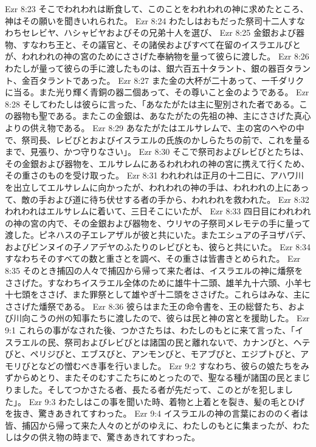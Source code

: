 Ezr 8:23  そこでわれわれは断食して、このことをわれわれの神に求めたところ、神はその願いを聞きいれられた。
Ezr 8:24  わたしはおもだった祭司十二人すなわちセレビヤ、ハシャビヤおよびその兄弟十人を選び、
Ezr 8:25  金銀および器物、すなわち王と、その議官と、その諸侯およびすべて在留のイスラエルびとが、われわれの神の宮のためにささげた奉納物を量って彼らに渡した。
Ezr 8:26  わたしが量って彼らの手に渡したものは、銀六百五十タラント、銀の器百タラント、金百タラントであった。
Ezr 8:27  また金の大杯が二十あって、一千ダリクに当る。また光り輝く青銅の器二個あって、その尊いこと金のようである。
Ezr 8:28  そしてわたしは彼らに言った、「あなたがたは主に聖別された者である。この器物も聖である。またこの金銀は、あなたがたの先祖の神、主にささげた真心よりの供え物である。
Ezr 8:29  あなたがたはエルサレムで、主の宮のへやの中で、祭司長、レビびとおよびイスラエルの氏族のかしらたちの前で、これを量るまで、見張り、かつ守りなさい」。
Ezr 8:30  そこで祭司およびレビびとたちは、その金銀および器物を、エルサレムにあるわれわれの神の宮に携えて行くため、その重さのものを受け取った。
Ezr 8:31  われわれは正月の十二日に、アハワ川を出立してエルサレムに向かったが、われわれの神の手は、われわれの上にあって、敵の手および道に待ち伏せする者の手から、われわれを救われた。
Ezr 8:32  われわれはエルサレムに着いて、三日そこにいたが、
Ezr 8:33  四日目にわれわれの神の宮の内で、その金銀および器物を、ウリヤの子祭司メレモテの手に量って渡した。ピネハスの子エレアザルが彼と共にいた。またエシュアの子ヨザバデ、およびビンヌイの子ノアデヤのふたりのレビびとも、彼らと共にいた。
Ezr 8:34  すなわちそのすべての数と重さとを調べ、その重さは皆書きとめられた。
Ezr 8:35  そのとき捕囚の人々で捕囚から帰って来た者は、イスラエルの神に燔祭をささげた。すなわちイスラエル全体のために雄牛十二頭、雄羊九十六頭、小羊七十七頭をささげ、また罪祭として雄やぎ十二頭をささげた。これらはみな、主にささげた燔祭である。
Ezr 8:36  彼らはまた王の命令書を、王の総督たち、および川向こうの州の知事たちに渡したので、彼らは民と神の宮とを援助した。
Ezr 9:1  これらの事がなされた後、つかさたちは、わたしのもとに来て言った、「イスラエルの民、祭司およびレビびとは諸国の民と離れないで、カナンびと、ヘテびと、ペリジびと、エブスびと、アンモンびと、モアブびと、エジプトびと、アモリびとなどの憎むべき事を行いました。
Ezr 9:2  すなわち、彼らの娘たちをみずからめとり、またそのむすこたちにめとったので、聖なる種が諸国の民とまじりました。そしてつかさたる者、長たる者が先だって、このとがを犯しました」。
Ezr 9:3  わたしはこの事を聞いた時、着物と上着とを裂き、髪の毛とひげを抜き、驚きあきれてすわった。
Ezr 9:4  イスラエルの神の言葉におののく者は皆、捕囚から帰って来た人々のとがのゆえに、わたしのもとに集まったが、わたしは夕の供え物の時まで、驚きあきれてすわった。
